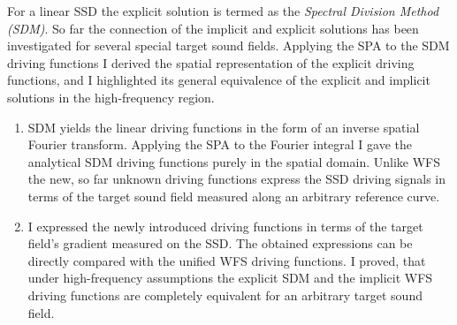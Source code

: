 \documentclass[a4paper,10pt]{article}
\begin{document}
\begin{enumerate}
For a linear SSD the explicit solution is termed as the \emph{Spectral Division Method (SDM)}.
So far the connection of the implicit and explicit solutions has been investigated for several special target sound fields.
Applying the SPA to the SDM driving functions I derived the spatial representation of the explicit driving functions, and I highlighted its general equivalence of the explicit and implicit solutions in the high-frequency region.
\begin{enumerate}
\item SDM yields the linear driving functions in the form of an inverse spatial Fourier transform.
Applying the SPA to the Fourier integral I gave the analytical SDM driving functions purely in the spatial domain.
Unlike WFS the new, so far unknown driving functions express the SSD driving signals in terms of the target sound field measured along an arbitrary reference curve.
\item I expressed the newly introduced driving functions in terms of the target field's gradient measured on the SSD.
The obtained expressions can be directly compared with the unified WFS driving functions.
I proved, that under high-frequency assumptions the explicit SDM and the implicit WFS driving functions are completely equivalent for an arbitrary target sound field.
\end{enumerate}


\end{enumerate}
\end{document}
